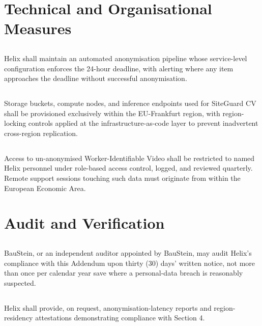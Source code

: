\documentclass[11pt]{article}
\begin{document}
\section{Technical and Organisational Measures}

\subsection{} Helix shall maintain an automated anonymisation pipeline whose service-level configuration enforces the 24-hour deadline, with alerting where any item approaches the deadline without successful anonymisation.

\subsection{} Storage buckets, compute nodes, and inference endpoints used for SiteGuard CV shall be provisioned exclusively within the EU-Frankfurt region, with region-locking controls applied at the infrastructure-as-code layer to prevent inadvertent cross-region replication.

\subsection{} Access to un-anonymised Worker-Identifiable Video shall be restricted to named Helix personnel under role-based access control, logged, and reviewed quarterly. Remote support sessions touching such data must originate from within the European Economic Area.

\section{Audit and Verification}

\subsection{} BauStein, or an independent auditor appointed by BauStein, may audit Helix's compliance with this Addendum upon thirty (30) days' written notice, not more than once per calendar year save where a personal-data breach is reasonably suspected.

\subsection{} Helix shall provide, on request, anonymisation-latency reports and region-residency attestations demonstrating compliance with Section 4.
\end{document}
